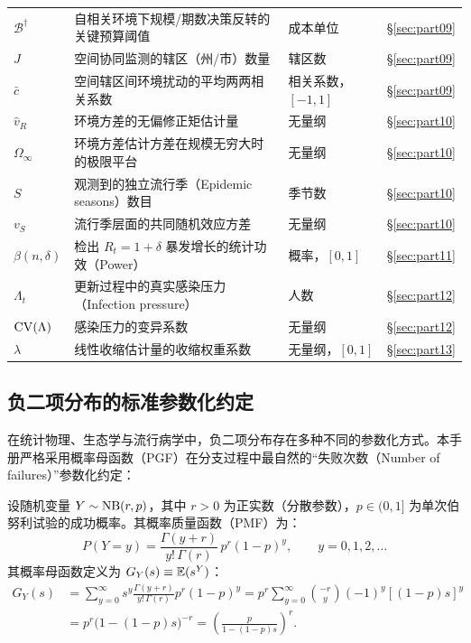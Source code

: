 \begin{center}
\begin{longtable}{@{}llll@{}}
$\mathcal{B}^\dagger$ & 自相关环境下规模/期数决策反转的关键预算阈值 & 成本单位 & \S\ref{sec:part09} \\
$J$ & 空间协同监测的辖区（州/市）数量 & 辖区数 & \S\ref{sec:part09} \\
$\bar{c}$ & 空间辖区间环境扰动的平均两两相关系数 & 相关系数，$[-1, 1]$ & \S\ref{sec:part09} \\
$\hat{v}_R$ & 环境方差的无偏修正矩估计量 & 无量纲 & \S\ref{sec:part10} \\
$\Omega_\infty$ & 环境方差估计方差在规模无穷大时的极限平台 & 无量纲 & \S\ref{sec:part10} \\
$S$ & 观测到的独立流行季（Epidemic seasons）数目 & 季节数 & \S\ref{sec:part10} \\
$v_S$ & 流行季层面的共同随机效应方差 & 无量纲 & \S\ref{sec:part10} \\
$\beta(n, \delta)$ & 检出 $R_t=1+\delta$ 暴发增长的统计功效（Power） & 概率，$[0, 1]$ & \S\ref{sec:part11} \\
$\Lambda_t$ & 更新过程中的真实感染压力（Infection pressure） & 人数 & \S\ref{sec:part12} \\
$\mathrm{CV}(\Lambda)$ & 感染压力的变异系数 & 无量纲 & \S\ref{sec:part12} \\
$\lambda$ & 线性收缩估计量的收缩权重系数 & 无量纲，$[0, 1]$ & \S\ref{sec:part13} \\
\bottomrule
\end{longtable}
\end{center}

\subsection{负二项分布的标准参数化约定}

在统计物理、生态学与流行病学中，负二项分布存在多种不同的参数化方式。本手册严格采用概率母函数（PGF）在分支过程中最自然的“失败次数（Number of failures）”参数化约定：
\begin{definition}[负二项分布 $\NB(r, p)$]
设随机变量 $Y \sim \mathrm{NB}(r, p)$，其中 $r > 0$ 为正实数（分散参数），$p \in (0, 1]$ 为单次伯努利试验的成功概率。其概率质量函数（PMF）为：
\begin{equation}
  P(Y = y) = \frac{\Gamma(y + r)}{y! \, \Gamma(r)} \, p^r (1 - p)^y, \qquad y = 0, 1, 2, \dots
  \label{eq:nb-pmf}
\end{equation}
其概率母函数定义为 $G_Y(s) \equiv \mathbb{E}(s^Y)$：
\begin{align}
  G_Y(s) &= \sum_{y=0}^\infty s^y \frac{\Gamma(y+r)}{y!\,\Gamma(r)} p^r (1-p)^y 
  = p^r \sum_{y=0}^\infty \binom{-r}{y} (-1)^y [(1-p)s]^y \nonumber \\
  &= p^r \big(1 - (1-p)s\big)^{-r} = \left( \frac{p}{1 - (1-p)s} \right)^r.
  \label{eq:nb-pgf}
\end{align}
\end{definition}

